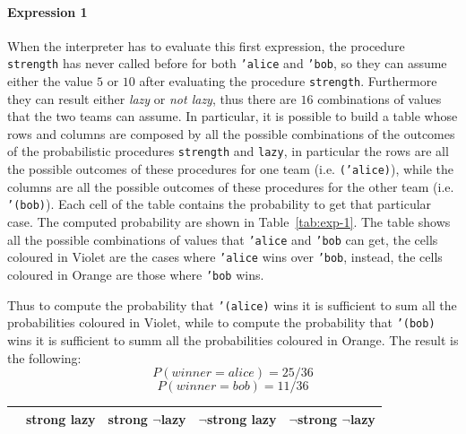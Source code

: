 \begin{itemize}
        \paragraph*{Expression 1} When the interpreter has to evaluate this first expression, the procedure \texttt{strength} has never 
        called before for both \texttt{'alice} and \texttt{'bob}, so they can assume either the value $5$ or $10$ after evaluating
        the procedure \texttt{strength}. Furthermore they can result either \textit{lazy} or \textit{not lazy}, thus there are
        $16$ combinations of values that the two teams can assume.
        In particular, it is possible to build a table whose rows and columns are composed by all the possible combinations of
        the outcomes of the probabilistic procedures \texttt{strength} and \texttt{lazy}, in particular
        the rows are all the possible outcomes of these procedures for one team (i.e. \texttt{('alice)}), 
        while the columns are all the possible outcomes of these procedures for the other team (i.e. \texttt{'(bob)}).
        Each cell of the table contains the probability to get that particular case. The computed probability are shown
        in Table~\ref{tab:exp-1}.
        The table shows all the possible combinations of values that \texttt{'alice} and \texttt{'bob} can get, the cells coloured
        in Violet are the cases where \texttt{'alice} wins over \texttt{'bob}, instead, the cells coloured in Orange are those
        where \texttt{'bob} wins.

        Thus to compute the probability that \texttt{'(alice)} wins it is sufficient to sum all the probabilities coloured in Violet,
        while to compute the probability that \texttt{'(bob)} wins it is sufficient to summ all the probabilities coloured in Orange.
        The result is the following:
        \[ P(winner = alice) = 25 / 36 \]
        \[ P(winner = bob) = 11 / 36 \]
        \begin{table}[H]
            \centering
            \bgroup
                \def\arraystretch{1.5}
                \begin{tabular}{| l | C{1.8cm} C{1.8cm} C{1.8cm} C{1.8cm}  |}                    
                    \hline
                     & 
                        \textbf{strong lazy} & \textbf{strong $\neg$lazy} & \textbf{$\neg$strong lazy} & \textbf{$\neg$strong $\neg$lazy} \\
                    \hline


\end{tabular}
\end{table}
\end{itemize}
